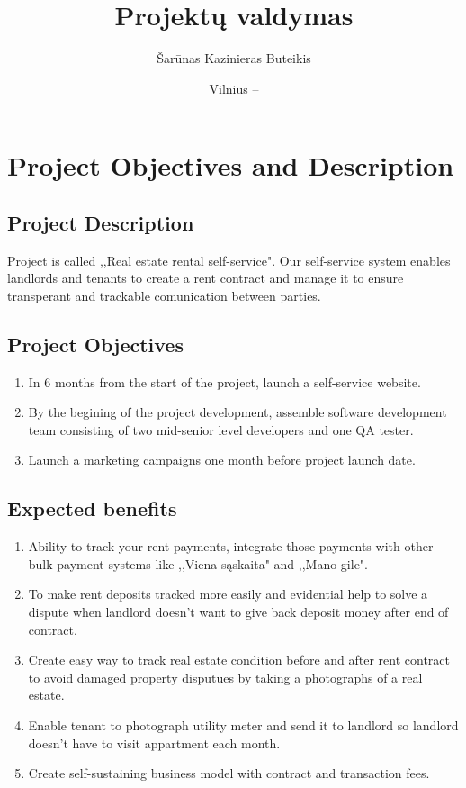 \documentclass{VUMIFPSkursinis}
\title{Projektų valdymas}
\author{Šarūnas Kazinieras Buteikis}
\date{Vilnius – \the\year}
\begin{document}
\maketitle

\tableofcontents

\section{Project Objectives and Description}
	\subsection{Project Description}
		Project is called ,,Real estate rental self-service". 
		Our self-service system enables landlords and tenants to create a rent contract and manage it to ensure transperant and trackable comunication between parties.

	\subsection{Project Objectives}
		\begin{enumerate}
			\item{In 6 months from the start of the project, launch a self-service website.}
			\item{By the begining of the project development, assemble software development team consisting of two mid-senior level developers and one QA tester.}
			\item{Launch a marketing campaigns one month before project launch date.}
		\end{enumerate}

	\subsection{Expected benefits}
		\begin{enumerate}
			\item{Ability to track your rent payments, integrate those payments with other bulk payment systems like ,,Viena sąskaita" and ,,Mano gile".}
			\item{To make rent deposits tracked more easily and evidential help to solve a dispute when landlord doesn't want to give back deposit money after end of contract.}
			\item{Create easy way to track real estate condition before and after rent contract to avoid damaged property disputues by taking a photographs of a real estate.}
			\item{Enable tenant to photograph utility meter and send it to landlord so landlord doesn't have to visit appartment each month.}
			\item{Create self-sustaining business model with contract and transaction fees.}
		\end{enumerate}
\end{document}
